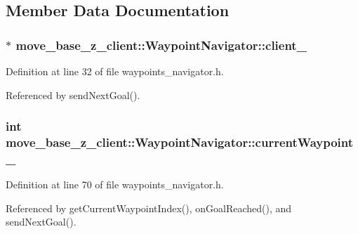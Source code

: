 \subsection{Member Data Documentation}
\subsubsection[{\texorpdfstring{client\+\_\+}{client_}}]{$\ast$ move\+\_\+base\+\_\+z\+\_\+client\+::\+Waypoint\+Navigator\+::client\+\_\+}\hypertarget{classmove__base__z__client_1_1WaypointNavigator_aadb289ffdaeda3a751fe569a2ee84c48}{}\label{classmove__base__z__client_1_1WaypointNavigator_aadb289ffdaeda3a751fe569a2ee84c48}


Definition at line 32 of file waypoints\+\_\+navigator.\+h.



Referenced by send\+Next\+Goal().

\subsubsection[{\texorpdfstring{current\+Waypoint\+\_\+}{currentWaypoint_}}]{\setlength{\rightskip}{0pt plus 5cm}int move\+\_\+base\+\_\+z\+\_\+client\+::\+Waypoint\+Navigator\+::current\+Waypoint\+\_\+\hspace{0.3cm}{\ttfamily [private]}}\hypertarget{classmove__base__z__client_1_1WaypointNavigator_a7da763128724f7b08c32c79cb3a88934}{}\label{classmove__base__z__client_1_1WaypointNavigator_a7da763128724f7b08c32c79cb3a88934}


Definition at line 70 of file waypoints\+\_\+navigator.\+h.



Referenced by get\+Current\+Waypoint\+Index(), on\+Goal\+Reached(), and send\+Next\+Goal().

